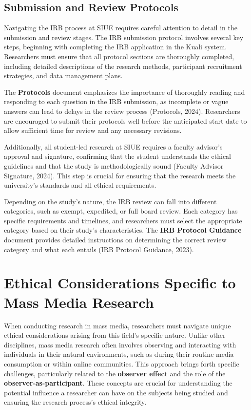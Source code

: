 \documentclass[
]{book}
\begin{document}
\subsection*{Submission and Review Protocols}\label{submission-and-review-protocols}

Navigating the IRB process at SIUE requires careful attention to detail in the submission and review stages. The IRB submission protocol involves several key steps, beginning with completing the IRB application in the Kuali system. Researchers must ensure that all protocol sections are thoroughly completed, including detailed descriptions of the research methods, participant recruitment strategies, and data management plans.

The \textbf{Protocols} document emphasizes the importance of thoroughly reading and responding to each question in the IRB submission, as incomplete or vague answers can lead to delays in the review process (Protocols, 2024). Researchers are encouraged to submit their protocols well before the anticipated start date to allow sufficient time for review and any necessary revisions.

Additionally, all student-led research at SIUE requires a faculty advisor's approval and signature, confirming that the student understands the ethical guidelines and that the study is methodologically sound (Faculty Advisor Signature, 2024). This step is crucial for ensuring that the research meets the university's standards and all ethical requirements.

Depending on the study's nature, the IRB review can fall into different categories, such as exempt, expedited, or full board review. Each category has specific requirements and timelines, and researchers must select the appropriate category based on their study's characteristics. The \textbf{IRB Protocol Guidance} document provides detailed instructions on determining the correct review category and what each entails (IRB Protocol Guidance, 2023).

\section{Ethical Considerations Specific to Mass Media Research}\label{ethical-considerations-specific-to-mass-media-research}

When conducting research in mass media, researchers must navigate unique ethical considerations arising from this field's specific nature. Unlike other disciplines, mass media research often involves observing and interacting with individuals in their natural environments, such as during their routine media consumption or within online communities. This approach brings forth specific challenges, particularly related to the \textbf{observer effect} and the role of the \textbf{observer-as-participant}. These concepts are crucial for understanding the potential influence a researcher can have on the subjects being studied and ensuring the research process's ethical integrity.
\end{document}

